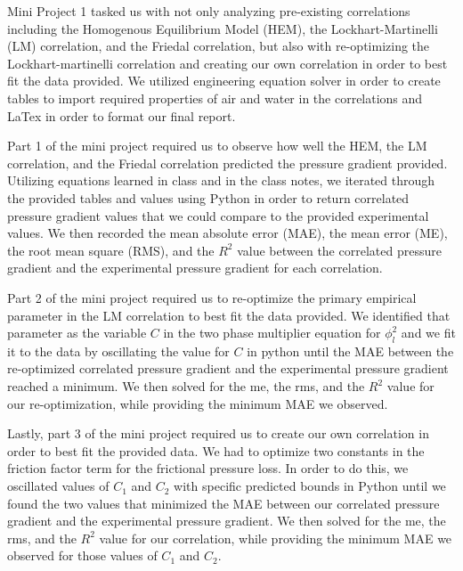 Mini Project 1 tasked us with not only analyzing pre-existing correlations including the Homogenous Equilibrium Model (HEM), the Lockhart-Martinelli (LM) correlation, and the Friedal correlation, but also with re-optimizing the Lockhart-martinelli correlation and creating our own correlation in order to best fit the data provided. We utilized engineering equation solver in order to create tables to import required properties of air and water in the correlations and LaTex in order to format our final report.
 
Part 1 of the mini project required us to observe how well the HEM, the LM correlation, and the Friedal correlation predicted the pressure gradient provided. Utilizing equations learned in class and in the class notes, we iterated through the provided tables and values using Python in order to return correlated pressure gradient values that we could compare to the provided experimental values. We then recorded the mean absolute error (MAE), the mean error (ME), the root mean square (RMS), and the \(R^2\) value between the correlated pressure gradient and the experimental pressure gradient for each correlation.

Part 2 of the mini project required us to re-optimize the primary empirical parameter in the LM correlation to best fit the data provided. We identified that parameter as the variable \(C\) in the two phase multiplier equation for \(\phi_l^2\) and we fit it to the data by oscillating the value for \(C\) in python until the MAE between the re-optimized correlated pressure gradient and the experimental pressure gradient reached a minimum. We then solved for the me, the rms, and the \(R^2\) value for our re-optimization, while providing the minimum MAE we observed.

Lastly, part 3 of the mini project required us to create our own correlation in order to best fit the provided data. We had to optimize two constants in the friction factor term for the frictional pressure loss. In order to do this, we oscillated values of \(C_1\) and \(C_2\) with specific predicted bounds in Python until we found the two values that minimized the MAE between our correlated pressure gradient and the experimental pressure gradient. We then solved for the me, the rms, and the \(R^2\) value for our correlation, while providing the minimum MAE we observed for those values of \(C_1\) and \(C_2\).
